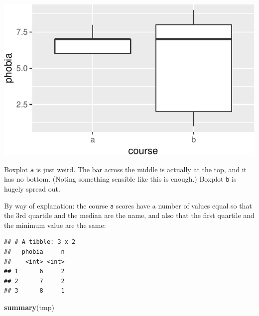 \documentclass[]{tufte-book}
\newenvironment{Shaded}{}{}
\newcommand{\KeywordTok}[1]{\textcolor[rgb]{0.00,0.44,0.13}{\textbf{#1}}}
\newcommand{\NormalTok}[1]{#1}
\newcommand{\OperatorTok}[1]{\textcolor[rgb]{0.40,0.40,0.40}{#1}}
\newcommand{\StringTok}[1]{\textcolor[rgb]{0.25,0.44,0.63}{#1}}
\theoremstyle{definition}
\theoremstyle{definition}
\theoremstyle{definition}
\theoremstyle{remark}
\begin{document}
\includegraphics{07-sign-mood-median_files/figure-latex/unnamed-chunk-66-1}

Boxplot \texttt{a} is just weird. The bar across the middle is actually
at the top, and it has no bottom. (Noting something sensible like this
is enough.) Boxplot \texttt{b} is hugely spread out.

By way of explanation: the course \texttt{a} scores have a number of
values equal so that the 3rd quartile and the median are the name, and
also that the first quartile and the minimum value are the same:

\begin{Shaded}
\end{Shaded}

\begin{verbatim}
## # A tibble: 3 x 2
##   phobia     n
##    <int> <int>
## 1      6     2
## 2      7     2
## 3      8     1
\end{verbatim}

\begin{Shaded}
\begin{Highlighting}[]
\KeywordTok{summary}\NormalTok{(tmp)}
\end{Highlighting}
\end{Shaded}
\end{document}

